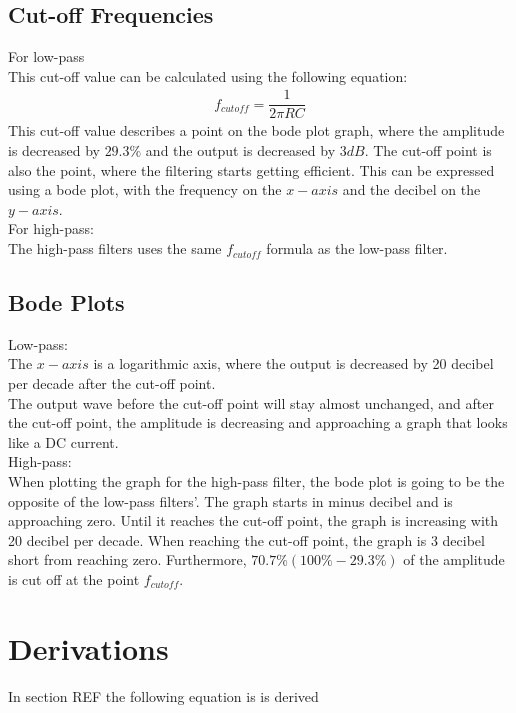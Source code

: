 \subsection{Cut-off Frequencies}
For low-pass \\
This cut-off value can be calculated using the following equation:
\begin{align*}
f_{cutoff}=\dfrac{1}{2 \pi RC}
\end{align*}
This cut-off value describes a point on the bode plot graph, where the amplitude is decreased by $29.3\%$ and the output is decreased by $3dB$. The cut-off point is also the point, where the filtering starts getting efficient. This can be expressed using a bode plot, with the frequency on the $x-axis$ and the decibel on the $y-axis$.\\
For high-pass: \\
The high-pass filters uses the same $f_{cutoff}$ formula as the low-pass filter.

\subsection{Bode Plots}
Low-pass: \\
The $x-axis$ is a logarithmic axis, where the output is decreased by 20 decibel per decade after the cut-off point. \\
The output wave before the cut-off point will stay almost unchanged, and after the cut-off point, the amplitude is decreasing and approaching a graph that looks like a DC current. \\
High-pass: \\
When plotting the graph for the high-pass filter, the bode plot is going to be the opposite of the low-pass filters'. The graph starts in minus decibel and is approaching zero. Until it reaches the cut-off point, the graph is increasing with 20 decibel per decade. When reaching the cut-off point, the graph is 3 decibel short from reaching zero. Furthermore, $70.7\% (100\%-29.3\%)$ of the amplitude is cut off at the point $f_{cutoff}$.
\section{Derivations}
In section REF the following equation is is derived \\

